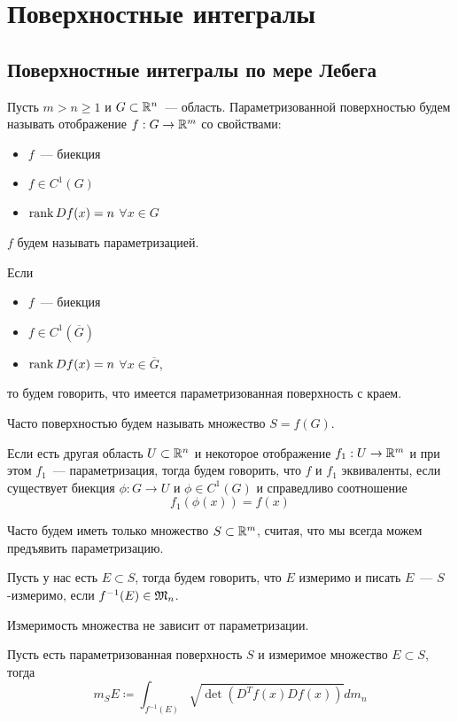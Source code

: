 \documentclass[main]{subfiles}
\begin{document}
\chapter{Поверхностные интегралы}
\section{Поверхностные интегралы по мере Лебега}
\begin{definition}
    Пусть $m > n \ge 1$ и $G \subset \mathbb{R}^n$~--- область.
    Параметризованной поверхностью будем называть отображение $f: G \to \mathbb{R}^m$ со свойствами:
    \begin{itemize}
        \item $f$~--- биекция
        \item $f \in C^1(G)$
        \item $\operatorname{rank} Df(x) = n$ $\forall x \in G$
    \end{itemize}
    $f$ будем называть параметризацией.

    Если
    \begin{itemize}
        \item $f$~--- биекция
        \item $f \in C^1(\overline{G})$
        \item $\operatorname{rank} Df(x) = n$ $\forall x \in \overline{G}$,
    \end{itemize}
    то будем говорить, что имеется параметризованная поверхность с краем.
\end{definition}
Часто поверхностью будем называть множество $S = f(G)$.

\begin{definition}
    Если есть другая область $U \subset \mathbb{R}^n$ и некоторое отображение $f_1: U \to \mathbb{R}^m$ и при этом $f_1$~--- параметризация, тогда будем говорить, что $f$ и $f_1$ эквиваленты, если существует биекция $\phi: G \to U$ и $\phi \in C^1(G)$ и справедливо соотношение
    \[f_1(\phi(x)) = f(x)\]
\end{definition}
Часто будем иметь только множество $S \subset \mathbb{R}^m$, считая, что мы всегда можем предъявить параметризацию.

Пусть у нас есть $E \subset S$, тогда будем говорить, что $E$ измеримо и писать $E$~--- $S$-измеримо, если $f^{-1}(E) \in \mathfrak{M}_n$.
\begin{proposition}
    Измеримость множества не зависит от параметризации.
\end{proposition}

\begin{definition}
    Пусть есть параметризованная поверхность $S$ и измеримое множество $E \subset S$, тогда
    \[m_S E \coloneq \int_{f^{-1}(E)} \sqrt{\det(D^Tf(x) Df(x))} dm_n\]
\end{definition}
\end{document}
